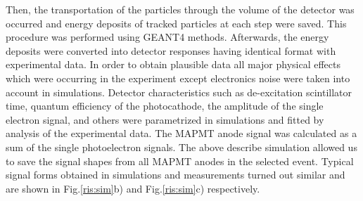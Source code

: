 \documentclass{webofc}
\newcommand{\er}{\textmd{EXPERTroot}}
\begin{document}
	
	Then, the transportation of the particles through the volume of the detector was occurred and energy deposits of tracked particles at each step were saved.
	This procedure was performed using GEANT4 \cite{geant4} methods. Afterwards, the energy deposits were converted into detector responses having identical format with experimental data.
	In order to obtain plausible data all major physical effects which were occurring in the experiment except electronics noise were taken into account in simulations.
	Detector characteristics such as de-excitation scintillator time, quantum efficiency of the photocathode, the amplitude of the single electron signal, and others were parametrized in simulations and fitted by analysis of the experimental data.
	The MAPMT anode signal was calculated as a sum of the single photoelectron signals.
	The above describe simulation allowed us to save the signal shapes  from all MAPMT anodes in the selected event.
	Typical signal forms obtained in simulations and measurements turned out similar and are shown in Fig.\ref{ris:sim}b) and Fig.\ref{ris:sim}c) respectively.
	
\end{document}
